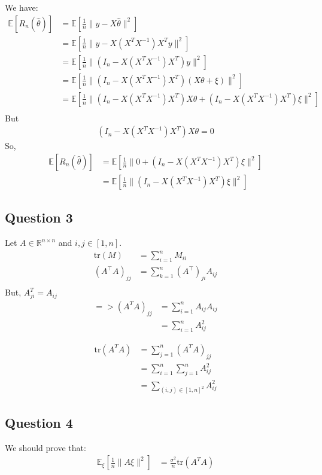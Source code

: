 \documentclass[11pt,a4paper]{article}
\theoremstyle{definition}
\theoremstyle{remark}
\begin{document}
We have:
\begin{align}
\mathbb{E} [R_n(\hat{\theta})] &= \mathbb{E} \left[ \frac{1}{n} \|y - X\hat{\theta}\|^2 \right] \\
&= \mathbb{E} \left[ \frac{1}{n} \|y - X(X^T X^{-1}) X^T y\|^2 \right] \\
&= \mathbb{E} \left[ \frac{1}{n} \|(I_n - X(X^T X^{-1}) X^T) y\|^2 \right] \\
&= \mathbb{E} \left[ \frac{1}{n} \|(I_n - X(X^T X^{-1}) X^T) (X\theta + \xi)\|^2 \right] \\
&= \mathbb{E} \left[ \frac{1}{n} \|(I_n - X(X^T X^{-1}) X^T)X\theta + (I_n - X(X^T X^{-1}) X^T) \xi\|^2 \right] \\
\end{align}
But 
\begin{align}
(I_n - X(X^T X^{-1}) X^T)X\theta = 0
\end{align}
So,
\begin{align}
\mathbb{E} [R_n(\hat{\theta})] &= \mathbb{E} \left[ \frac{1}{n} \| 0 + (I_n - X(X^T X^{-1}) X^T) \xi\|^2 \right]\\
&= \mathbb{E} \left[ \frac{1}{n} \|(I_n - X(X^T X^{-1}) X^T) \xi\|^2 \right]
\end{align}

\setcounter{subsection}{3}
\subsection{Question 3}
Let \( A \in \mathbb{R}^{n \times n} \) and \( i, j \in [1, n] \).
\begin{align}
\text{tr}(M) &= \sum_{i=1}^{n} M_{ii} \\
(A^\top A)_{jj} &= \sum_{k=1}^{n} (A^\top)_{ji} A_{ij}\\
\end{align}
But, $A_{ji}^T = A_{ij}$
\begin{align}
=> (A^T A)_{jj} &= \sum_{i=1}^n A_{ij} A_{ij} \\
&= \sum_{i=1}^n A_{ij}^2
\end{align}

\begin{align}
\text{tr}(A^T A) &= \sum_{j=1}^n (A^{T} A)_{jj} \\
&= \sum_{i=1}^n \sum_{j=1}^n A_{ij}^2 \\
&= \sum_{(i,j) \in [1,n]^2} A_{ij}^2
\end{align}

\setcounter{subsection}{3}
\subsection{Question 4}
We should prove that:
\begin{align}
\mathbb{E}_\xi \left[ \frac{1}{n} \|A\xi\|^2 \right] &= \frac{\sigma^2}{n} \text{tr}(A^T A)
\end{align}
\end{document}
